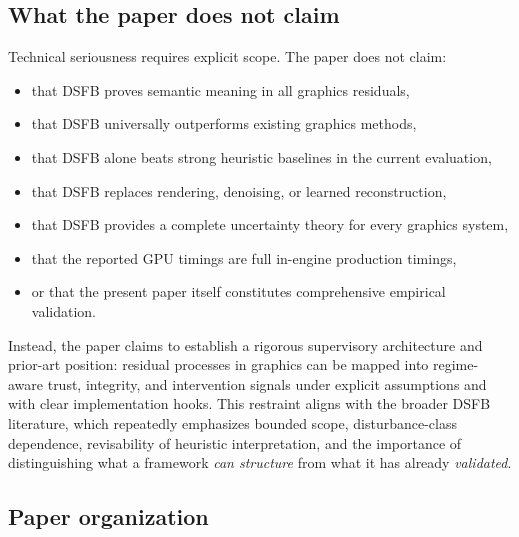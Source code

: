 \documentclass[11pt]{article}
\theoremstyle{definition}
\theoremstyle{plain}
\begin{document}

\subsection{What the paper does not claim}

Technical seriousness requires explicit scope. The paper does not claim:
\begin{itemize}[leftmargin=1.5em]
    \item that DSFB proves semantic meaning in all graphics residuals,
    \item that DSFB universally outperforms existing graphics methods,
    \item that DSFB alone beats strong heuristic baselines in the current evaluation,
    \item that DSFB replaces rendering, denoising, or learned reconstruction,
    \item that DSFB provides a complete uncertainty theory for every graphics system,
    \item that the reported GPU timings are full in-engine production timings,
    \item or that the present paper itself constitutes comprehensive empirical validation.
\end{itemize}

Instead, the paper claims to establish a rigorous supervisory architecture and prior-art position: residual processes in graphics can be mapped into regime-aware trust, integrity, and intervention signals under explicit assumptions and with clear implementation hooks. This restraint aligns with the broader DSFB literature, which repeatedly emphasizes bounded scope, disturbance-class dependence, revisability of heuristic interpretation, and the importance of distinguishing what a framework \emph{can structure} from what it has already \emph{validated}. 


\subsection{Paper organization}
\end{document}
